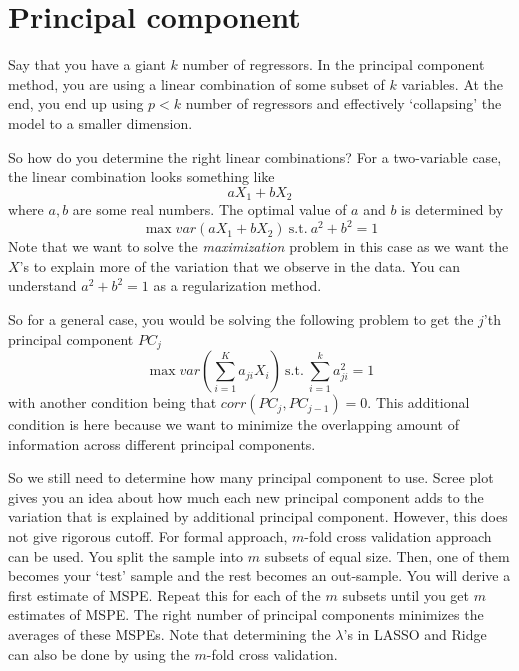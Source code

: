 \section{Principal component}
Say that you have a giant $k$ number of regressors. In the principal component method, you are using a linear combination of some subset of $k$ variables. At the end, you end up using $p<k$ number of regressors and effectively `collapsing' the model to a smaller dimension. 
\par\medskip
So how do you determine the right linear combinations? For a two-variable case, the linear combination looks something like
\[
aX_1 + bX_2
\]
where $a,b$ are some real numbers. The optimal value of $a$ and $b$ is determined by
\[
\max var(aX_1+bX_2)\  \text{s.t.}\ a^2+b^2=1
\]
Note that we want to solve the \textit{maximization} problem in this case as we want the $X$'s to explain more of the variation that we observe in the data. You can understand $a^2+b^2=1$ as a regularization method. 
\par\medskip
So for a general case, you would be solving the following problem to get the $j$'th principal component $PC_j$
\[
\max var\left(\sum_{i=1}^Ka_{ji}X_i\right)\  \text{s.t.}\ \sum_{i=1}^ka_{ji}^2=1
\]
with another condition being that $corr(PC_j,PC_{j-1})=0$. This additional condition is here because we want to minimize the overlapping amount of information across different principal components.
\par\medskip
So we still need to determine how many principal component to use. Scree plot gives you an idea about how much each new principal component adds to the variation that is explained by additional principal component. However, this does not give rigorous cutoff. For formal approach, $m$-fold cross validation approach can be used. You split the sample into $m$ subsets of equal size. Then, one of them becomes your `test' sample and the rest becomes an out-sample. You will derive a first estimate of MSPE. Repeat this for each of the $m$ subsets until you get $m$ estimates of MSPE. The right number of  principal components minimizes the averages of these MSPEs. Note that determining the $\lambda$'s in LASSO and Ridge can also be done by using the $m$-fold cross validation. 

